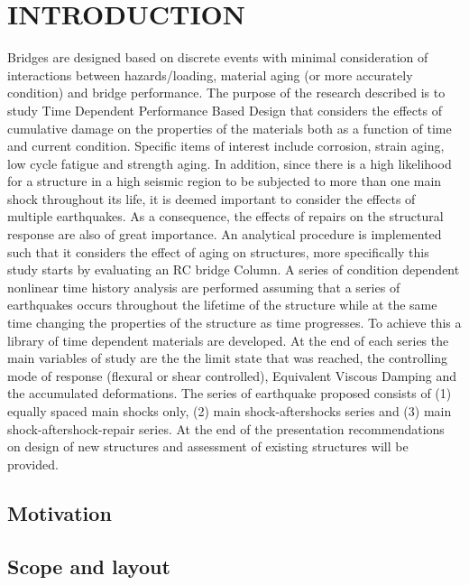 \chapter{INTRODUCTION}
\label{chap-one}

Bridges are designed based on discrete events with minimal consideration of interactions between hazards/loading, material aging (or more accurately condition) and bridge performance. The purpose of the research described is to study Time Dependent Performance Based Design that considers the effects of cumulative damage on the properties of the materials both as a function of time and current condition. Specific items of interest include corrosion, strain aging, low cycle fatigue and strength aging. In addition, since there is a high likelihood for a structure  in a high seismic region to be subjected to more than one main shock throughout its life, it is deemed important to consider the effects of multiple earthquakes. As a consequence, the effects of repairs on the structural response are also of great importance. An analytical procedure is implemented such that it considers the effect of aging on structures, more specifically this study starts by evaluating an RC bridge Column. A series of condition dependent nonlinear time history analysis are performed assuming that a series of earthquakes occurs throughout the lifetime of the structure while at the same time changing the properties of the structure as time progresses. To achieve this a library of time dependent materials are developed. At the end of each series the main variables of study are the the limit state that was reached, the controlling mode of response (flexural or shear controlled), Equivalent Viscous Damping and the accumulated deformations. The series of earthquake proposed consists of (1) equally spaced main shocks only, (2) main shock-aftershocks series and (3) main shock-aftershock-repair series. At the end of the presentation recommendations on design of new structures and assessment of existing structures will be provided.

\section{Motivation}
\lipsum[1]
\section{Scope and layout}
\lipsum[2]